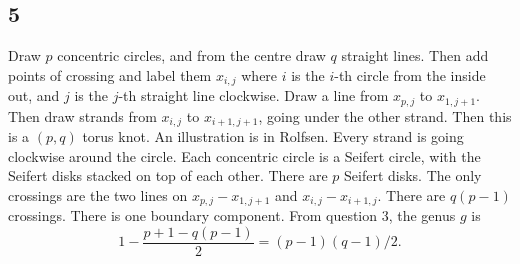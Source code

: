 \documentclass{article}
\theoremstyle{definition}
\numberwithin{theorem}{section}
\numberwithin{equation}{section}
\begin{document}
\subsection{5}
Draw $p$ concentric circles, and from the centre draw $q$ straight lines. Then add points of crossing and label them $x_{i,j}$ where $i$ is the $i$-th circle from the inside out, and $j$ is the $j$-th straight line clockwise. Draw a line from $x_{p, j}$ to $x_{1, j+1}$. Then draw strands from $x_{i, j}$ to $x_{i + 1, j + 1}$, going under the other strand. Then this is a $(p, q)$ torus knot. An illustration is in Rolfsen. Every strand is going clockwise around the circle. Each concentric circle is a Seifert circle, with the Seifert disks stacked on top of each other. There are $p$ Seifert disks. The only crossings are the two lines on $x_{p, j} - x_{1, j+1}$ and $x_{i, j} - x_{i + 1, j}$. There are $q(p-1)$ crossings. There is one boundary component. From question 3, the genus $g$ is
\[1 - \frac{p + 1 - q(p-1)}{2} = (p-1)(q-1)/2.\]
\end{document}
